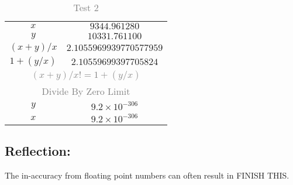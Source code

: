 \documentclass[main.tex]{subfiles}
\begin{document}
            \begin{table}[H]
                \begin{center}
                    \caption{\textcolor{gray}{Test 2}}
                    \begin{tabular}{c c}
                        \hline
                        \(x\) & \(9344.961280\) \\
                        \(y\) & \(10331.761100\) \\
                        \hline
                        \hline
                        \((x + y) / x\) & \(2.1055969939770577959\) \\
                        \(1 + (y / x)\) & \(2.10559699397705824\) \\
                        \multicolumn{2}{c}{\textcolor{gray}{\((x + y) / x != 1 + ( y / x)\)}} \\
                        \hline
                        \hline
                        \multicolumn{2}{c}{\textcolor{gray}{Divide By Zero Limit}} \\
                        \(y\) & \(9.2 \times 10^{-306}\) \\
                        \(x\) & \(9.2 \times 10^{-306}\) \\
                        \hline
                    \end{tabular}
                \end{center}
            \end{table}


        \subsection*{Reflection:}
            The in-accuracy from floating point numbers can often result in FINISH THIS.
\end{document}
